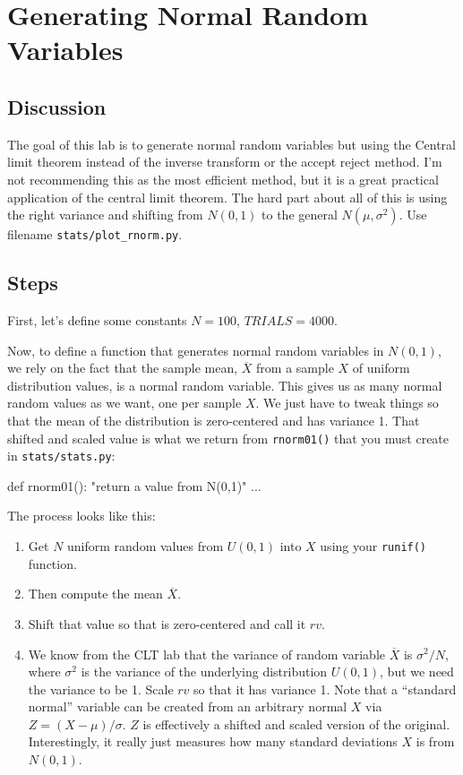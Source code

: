 \chapter{Generating Normal Random Variables}

\setcounter{problem}{1}
\section{Discussion}

\begin{fullwidth}


The goal of this lab is to generate normal random variables but using the Central limit theorem instead of the inverse transform or the accept reject method. I'm not recommending this as the most efficient method, but it is a great practical application of the central limit theorem.  The hard part about all of this is using the right variance and shifting from $N(0,1)$ to the general $N(\mu, \sigma^2)$. Use filename {\tt stats/plot\_rnorm.py}.

\section{Steps}

\step First, let's define some constants $N = 100$, $TRIALS = 4000$.

\step Now, to define a function that generates normal random variables in $N(0,1)$, we rely on the fact that the sample mean, $\overline X$ from a sample $X$ of uniform distribution values, is a normal random variable.  This gives us as many normal random values as we want, one per sample $X$. We just have to tweak things so that the mean of the distribution is zero-centered and has variance 1. That shifted and scaled value is what we return from {\tt rnorm01()} that you must create in {\tt stats/stats.py}:

\begin{pyverbatim}
def rnorm01():
    "return a value from N(0,1)"
    ...
\end{pyverbatim}	

\noindent The process looks like this:

\renewcommand{\theenumi}{\Alph{enumi}}

\begin{enumerate}
\item Get $N$ uniform random values from $U(0,1)$ into $X$ using your {\tt runif()} function.
\item Then compute the mean $\overline X$.
\item Shift that value so that is zero-centered and call it $rv$.
\item We know from the CLT lab that the variance of random variable $\overline X$ is $\sigma^2 / N$, where $\sigma^2$ is the variance of the underlying distribution $U(0,1)$, but we need the variance to be 1. Scale $rv$ so that it has variance 1. Note that a ``standard normal'' variable can be created from an arbitrary normal $X$ via $Z = (X-\mu)/\sigma$. $Z$ is effectively a shifted and scaled version of the original.  Interestingly, it really just measures how many standard deviations $X$ is from $N(0,1)$.
\end{enumerate}


\end{fullwidth}
